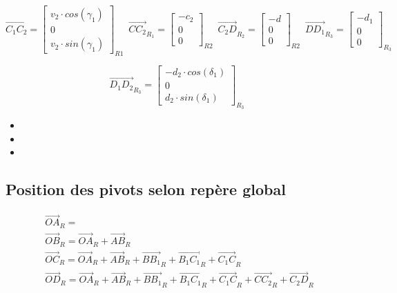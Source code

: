 \documentclass[12pt,a4paper,twoside]{article}
\begin{document}
\begin{equation}
\vec{C_1 C_2}=
\begin{bmatrix}
v_2\cdot cos(\gamma_1) \\
0\\
v_2 \cdot sin(\gamma_1)
\end{bmatrix}_{R1} \enspace
\vec{C C_2}_{R_{1}}=
\begin{bmatrix}
-c_2\\
0\\
0
\end{bmatrix}_{R2} \enspace
\vec{C_2 D}_{R_2}=
\begin{bmatrix}
-d\\
0\\
0
\end{bmatrix}_{R2} \enspace
\vec{D D_1}_{R_3}=
\begin{bmatrix}
- d_1\\
0\\
0
\end{bmatrix}_{R_3} \enspace
\end{equation}

\begin{equation}
\vec{D_1 D_2}_{R_3}=
\begin{bmatrix}
-d_2 \cdot cos(\delta_1)\\
0\\
d_2 \cdot sin(\delta_1)
\end{bmatrix}_{R_3} \enspace
\end{equation}

\begin{itemize}
	\item
	\item 
	\item 
\end{itemize}


\medbreak

\medbreak

\medbreak

\medbreak


\subsection{Position des pivots selon repère global}
\begin{eqnarray}
\vec{OA}_R=\\
\vec{OB}_R=\vec{OA}_R+\vec{AB}_R\\
\vec{OC}_R=\vec{OA}_R+\vec{AB}_R+\vec{B B_1}_R+\vec{B_1 C_1}_R+\vec{C_1 C}_R\\
\vec{OD}_R=\vec{OA}_R+\vec{AB}_R+\vec{B B_1}_R+\vec{B_1 C_1}_R+\vec{C_1 C}_R+\vec{C C_2}_R+\vec{C_2 D}_R
\end{eqnarray}
\end{document}
